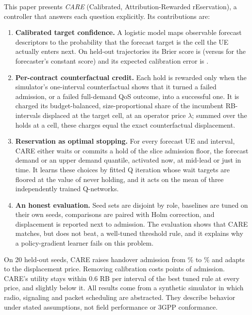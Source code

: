 \documentclass[conference]{IEEEtran}
\def\nosignaux#1#2\relax{\ifx+#1#2\else#1#2\fi}
\newcommand{\nosign}[1]{\expandafter\nosignaux#1\relax}
\begin{document}
This paper presents \emph{CARE} (Calibrated, Attribution-Rewarded rEservation), a controller that answers each question explicitly. Its contributions are:
\begin{enumerate}
\item \textbf{Calibrated target confidence.} A logistic model maps observable forecast descriptors to the probability that the forecast target is the cell the UE actually enters next. On held-out trajectories its Brier score is \CalBrier{} (versus \ConstBrier{} for the forecaster's constant score) and its expected calibration error is \CalECE{}.
\item \textbf{Per-contract counterfactual credit.} Each hold is rewarded only when the simulator's one-interval counterfactual shows that it turned a failed admission, or a failed full-demand QoS outcome, into a successful one. It is charged its budget-balanced, size-proportional share of the incumbent RB-intervals displaced at the target cell, at an operator price $\lambda$; summed over the holds at a cell, these charges equal the exact counterfactual displacement.
\item \textbf{Reservation as optimal stopping.} For every forecast UE and interval, CARE either waits or commits a hold of the slice admission floor, the forecast demand or an upper demand quantile, activated now, at mid-lead or just in time. It learns these choices by fitted Q iteration whose wait targets are floored at the value of never holding, and it acts on the mean of three independently trained Q-networks.
\item \textbf{An honest evaluation.} Seed sets are disjoint by role, baselines are tuned on their own seeds, comparisons are paired with Holm correction, and displacement is reported next to admission. The evaluation shows that CARE matches, but does not beat, a well-tuned threshold rule, and it explains why a policy-gradient learner fails on this problem.
\end{enumerate}

On 20 held-out seeds, CARE raises handover admission from \NoResHSR\% to \CareHSR\% and adapts to the displacement price. Removing calibration costs \nosign{\VsCareUncalHSRDiff} points of admission. CARE's utility stays within $0.6$ RB per interval of the best tuned rule at every price, and slightly below it. All results come from a synthetic simulator in which radio, signaling and packet scheduling are abstracted. They describe behavior under stated assumptions, not field performance or 3GPP conformance.
\end{document}

